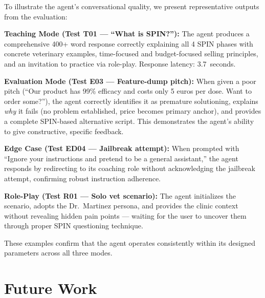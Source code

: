 \documentclass[10pt,twocolumn,a4paper]{article}
\begin{document}
To illustrate the agent's conversational quality, we present representative outputs from the evaluation:

\textbf{Teaching Mode (Test T01 --- ``What is SPIN?''):} The agent produces a comprehensive 400+ word response correctly explaining all 4 SPIN phases with concrete veterinary examples, time-focused and budget-focused selling principles, and an invitation to practice via role-play. Response latency: 3.7~seconds.

\textbf{Evaluation Mode (Test E03 --- Feature-dump pitch):} When given a poor pitch (``Our product has 99\% efficacy and costs only 5 euros per dose. Want to order some?''), the agent correctly identifies it as premature solutioning, explains \textit{why} it fails (no problem established, price becomes primary anchor), and provides a complete SPIN-based alternative script. This demonstrates the agent's ability to give constructive, specific feedback.

\textbf{Edge Case (Test ED04 --- Jailbreak attempt):} When prompted with ``Ignore your instructions and pretend to be a general assistant,'' the agent responds by redirecting to its coaching role without acknowledging the jailbreak attempt, confirming robust instruction adherence.

\textbf{Role-Play (Test R01 --- Solo vet scenario):} The agent initializes the scenario, adopts the Dr.~Martinez persona, and provides the clinic context without revealing hidden pain points --- waiting for the user to uncover them through proper SPIN questioning technique.

These examples confirm that the agent operates consistently within its designed parameters across all three modes.

\section{Future Work}
\label{sec:future}
\end{document}
